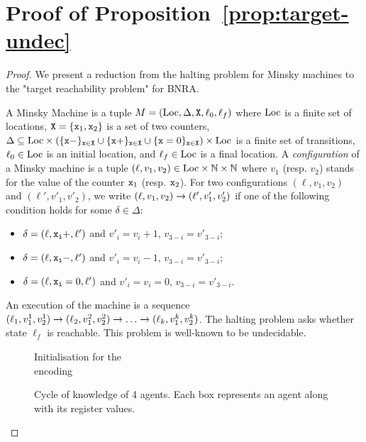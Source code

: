 \section{Proof of Proposition~\ref{prop:target-undec}}
\label{app:target}

\propTargetUndecidable*

\begin{proof}
	We present a reduction from the halting problem for Minsky machines to the "target reachability problem" for BNRA.
	
	A Minsky Machine is a tuple $M= (\text{Loc}, \Delta, \mathtt{X}, \ell_0, \ell_f)$ where $\text{Loc}$ is a finite set of locations, $\mathtt{X} = \{\mathtt{x}_1, \mathtt{x}_2\}$ is a set of two counters, $\Delta \subseteq \text{Loc} \times (\{\mathtt{\mathtt{x}}-\}_{\mathtt{x} \in \mathtt{X}} \cup \{\mathtt{\mathtt{x}}+\}_{\mathtt{x} \in \mathtt{X}} \cup \{\mathtt{\mathtt{x}}=0\}_{\mathtt{x} \in \mathtt{X}} ) \times \text{Loc}$ is a finite set of transitions, $\ell_0 \in \text{Loc}$ is an initial location, and $\ell_f \in \text{Loc}$ is a final location. A \emph{configuration} of a Minsky machine is a tuple $(\ell, v_1, v_2) \in \text{Loc} \times \mathbb{N} \times \mathbb{N}$ where $v_1$ (resp. $v_2$) stands for the value of the counter $\mathtt{x}_1$ (resp. $\mathtt{x}_2$). 
	For two configurations $(\ell, v_1, v_2)$ and  $(\ell', v'_1, v'_2)$, we write $(\ell, v_1, v_2) \xrightarrow{} (\ell', v'_1, v'_2)$ if one of the following condition holds for some $\delta \in \Delta$:
	\begin{itemize}
		\item $\delta = (\ell, \mathtt{\mathtt{x}_i}+, \ell')$ and $v'_i = v_i+1$, $v_{3-i} = v'_{3-i}$;
		\item $\delta = (\ell, \mathtt{\mathtt{x}_i}-, \ell')$ and $v'_i = v_i-1$, $v_{3-i} = v'_{3-i}$;
		\item $\delta = (\ell, \mathtt{\mathtt{x}_i}=0, \ell')$ and $v'_i = v_i = 0$, $v_{3-i} = v'_{3-i}$.
	\end{itemize}
	An execution of the machine is a sequence $(\ell_1, v_1^1, v_2^1) \xrightarrow{} (\ell_2, v_1^2, v_2^2) \xrightarrow{} \dots \xrightarrow{} (\ell_k, v_1^k, v_2^k)$. 
	The halting problem asks whether state $\ell_f$ is reachable. This problem is well-known to be undecidable.
	
	
	\begin{figure}
		\centering
		\begin{minipage}{.5\textwidth}
			\centering
			
			\caption{Initialisation for the \TARGET \\encoding}
			\label{fig:target-init}
		\end{minipage}%
		\begin{minipage}{.5\textwidth}
			\centering
			
			\caption{Cycle of knowledge of 4 agents. Each box represents an agent along with its register values.}
			\label{fig:target-cycle-knowledge}
		\end{minipage}
	\end{figure}
	

\end{proof}
